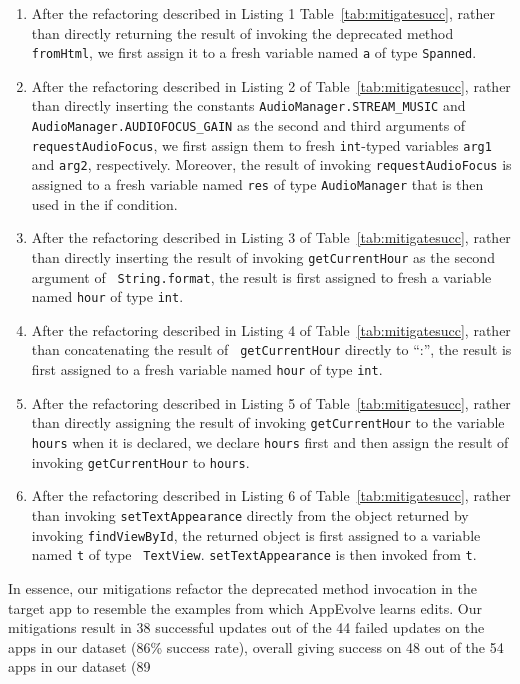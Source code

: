 \begin{enumerate}
\item After the refactoring described in Listing 1
Table~\ref{tab:mitigatesucc}, rather than directly returning the result of
invoking the deprecated method {\tt fromHtml}, we first assign it to a fresh
variable named {\tt a} of type {\tt Spanned}.

\item After the refactoring described in Listing 2 of
Table~\ref{tab:mitigatesucc}, rather than directly inserting the constants
{\tt AudioManager.STREAM\_MUSIC} and {\tt AudioManager.AUDIOFOCUS\_GAIN} as
the second and third arguments of {\tt requestAudioFocus}, we first assign
them to fresh {\tt int}-typed variables {\tt arg1} and {\tt arg2},
respectively. Moreover, the result of invoking {\tt requestAudioFocus} is
assigned to a fresh variable named {\tt res} of type {\tt AudioManager}
that is then used in the if condition.

\item After the refactoring described in Listing 3 of
Table~\ref{tab:mitigatesucc}, rather than directly inserting the result of
invoking {\tt getCurrentHour} as the second argument of {\tt
String.format}, the result is first assigned to fresh a variable named {\tt hour}
of type {\tt int}.

\item After the refactoring described in Listing 4 of
Table~\ref{tab:mitigatesucc}, rather than concatenating the result of {\tt
getCurrentHour} directly to ``:'', the result is first assigned to a fresh
variable named {\tt hour} of type {\tt int}.

\item After the refactoring described in Listing 5 of
Table~\ref{tab:mitigatesucc}, rather than directly assigning the result of
invoking {\tt getCurrentHour} to the variable {\tt hours} when it is
declared, we declare {\tt hours} first and then assign the result of
invoking {\tt getCurrentHour} to {\tt hours}.

\item After the refactoring described in Listing 6 of
Table~\ref{tab:mitigatesucc}, rather than invoking {\tt setTextAppearance}
directly from the object returned by invoking {\tt findViewById}, the
returned object is first assigned to a variable named {\tt t} of type {\tt
TextView}. {\tt setTextAppearance} is then invoked from {\tt t}.

\end{enumerate}

In essence, our mitigations refactor the deprecated method invocation in
the target app to resemble the examples from which AppEvolve learns
edits. Our mitigations result in 38 successful updates out of the 44 failed
updates on the apps in our dataset (86\% success rate), overall giving
success on 48 out of the 54 apps in our dataset (89%
